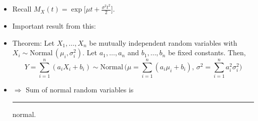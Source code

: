 \documentclass{article}
\newcommand{\blankul}[1]{\rule[-1.5mm]{#1}{0.15mm}}	%
\newcommand{\vecn}[2]{#1_1, \ldots, #1_{#2}}	%
\newcommand{\follow}[1]{\sim \text{#1}\,}		%
\begin{document}
\begin{itemize}
     \item[] Recall $M_X(t) = \exp\big[\mu t + \frac{\sigma^2 t^2}{2}\big]$.\vspace{150pt}
     \item Important result from this:
     \item[] Theorem: Let $\vecn{X}{n}$ be mutually independent random variables with \\$X_i \follow{Normal}(\mu_i, \sigma_i^2)$. Let $\vecn{a}{n}$ and $\vecn{b}{n}$ be fixed constants. Then,
     \[Y =\sum_{i = 1}^n (a_i X_i + b_i) \follow{Normal}\bigg(\mu = \sum_{i = 1}^n (a_i \mu_i + b_i), \, \sigma^2 = \sum_{i = 1}^n a_i^2 \sigma_i^2\bigg)\]\vspace{15pt}
     \item[]  $\Longrightarrow$ Sum of normal random variables is \blankul{2cm} normal.
\end{itemize}
\end{document}

